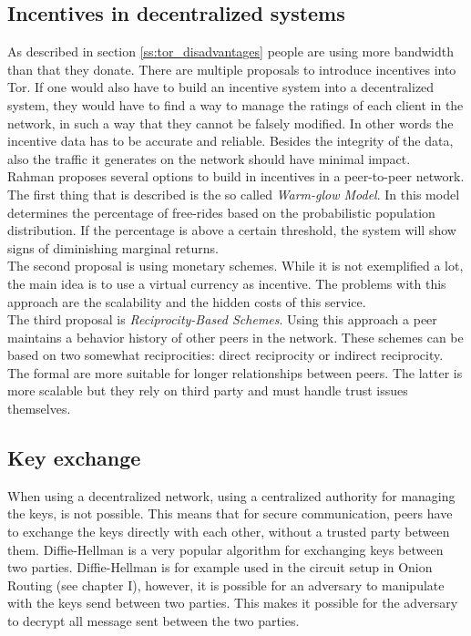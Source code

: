 \documentclass[journal]{IEEEtran}
\begin{document}
		\subsection{Incentives in decentralized systems}
		As described in section \ref{ss:tor_disadvantages} people are using more bandwidth than that they donate. There are multiple proposals \cite{dingledine2010building, jansen13lira} to introduce incentives into Tor. If one would also have to build an incentive system into a decentralized system, they would have to find a way to manage the ratings of each client in the network, in such a way that they cannot be falsely modified. In other words the incentive data has to be accurate and reliable. Besides the integrity of the data, also the traffic it generates on the network should have minimal impact.\\
		
		Rahman \cite{rahman2009survey} proposes several options to build in incentives in a peer-to-peer network. The first thing that is described is the so called \emph{Warm-glow Model}. In this model determines the percentage of free-rides based on the probabilistic population distribution. If the percentage is above a certain threshold, the system will show signs of diminishing marginal returns.\\
		
		The second proposal is using monetary schemes. While it is not exemplified a lot, the main idea is to use a virtual currency as incentive. The problems with this approach are the scalability and the hidden costs of this service.\\
		
		The third proposal is \emph{Reciprocity-Based Schemes}. Using this approach a peer maintains a behavior history of other peers in the network. These schemes can be based on two somewhat reciprocities: direct reciprocity or indirect reciprocity. The formal are more suitable for longer relationships between peers. The latter is more scalable but they rely on third party and must handle trust issues themselves.

		\subsection{Key exchange}
		When using a decentralized network, using a centralized authority for managing the keys, is not possible. This means that for secure communication, peers have to exchange the keys directly with each other, without a trusted party between them. Diffie-Hellman is a very popular algorithm for exchanging keys between two parties. Diffie-Hellman is for example used in the circuit setup in Onion Routing (see chapter I), however, it is possible for an adversary to manipulate with the keys send between two parties. This makes it possible for the adversary to decrypt all message sent between the two parties.
\end{document}

